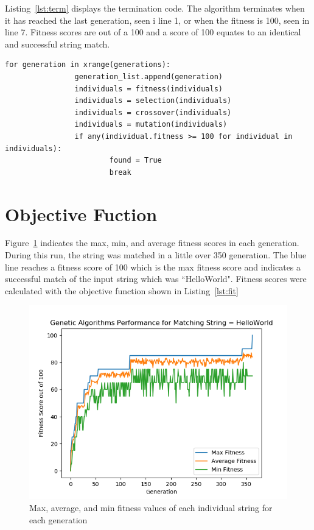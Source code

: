 \documentclass[12pt]{article}
\begin{document}
Listing~\ref{lst:term} displays the termination code.  The algorithm terminates
when it has reached the last generation, seen i line 1, or when the fitness is
100, seen in line 7.  Fitness scores are out of a 100 and a score of 100 equates
to an identical and successful string match.

\begin{lstlisting}[caption={Termination}, label={lst:term}]
 for generation in xrange(generations):
                generation_list.append(generation)
                individuals = fitness(individuals)
                individuals = selection(individuals)
                individuals = crossover(individuals)
                individuals = mutation(individuals)
                if any(individual.fitness >= 100 for individual in individuals):
                        found = True
                        break
\end{lstlisting}

\section{Objective Fuction}

Figure~\ref{fig:fitness} indicates the max, min, and average fitness scores in
each generation.  During this run, the string was matched in a little over 350
generation.  The blue line reaches a fitness score of 100 which is the max
fitness score and indicates a successful match of the input string which was
``HelloWorld".  Fitness scores were calculated with the objective function shown
in Listing~\ref{lst:fit}

\begin{figure}[H]
        \centering
        \includegraphics[width=.8\textwidth]{figures/Figure_3.png}
        \caption{Max, average, and min fitness values of each individual string
for each generation}
        \label{fig:fitness}
\end{figure}
\end{document}
